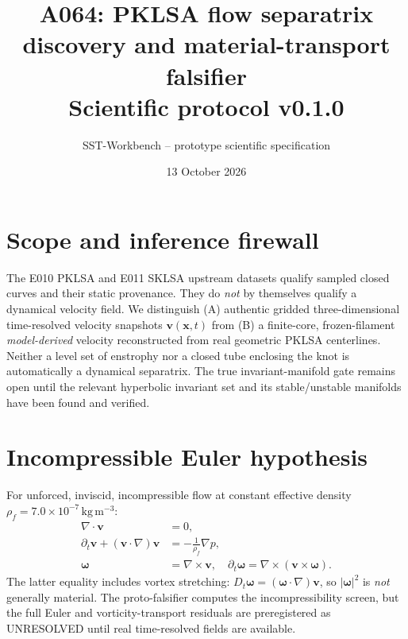 \documentclass[11pt,a4paper]{article}
\newcommand{\rhof}{\rho_{\!f}}
\begin{document}
\title{A064: PKLSA flow separatrix discovery and material-transport falsifier\\Scientific protocol v0.1.0}
\author{SST-Workbench -- prototype scientific specification}
\date{13 October 2026}
\maketitle
\section{Scope and inference firewall}
The E010 PKLSA and E011 SKLSA upstream datasets qualify sampled closed curves and their static provenance. They do \emph{not} by themselves qualify a dynamical velocity field. We distinguish (A) authentic gridded three-dimensional time-resolved velocity snapshots $\mathbf v(\mathbf x,t)$ from (B) a finite-core, frozen-filament \emph{model-derived} velocity reconstructed from real geometric PKLSA centerlines. Neither a level set of enstrophy nor a closed tube enclosing the knot is automatically a dynamical separatrix. The true invariant-manifold gate remains open until the relevant hyperbolic invariant set and its stable/unstable manifolds have been found and verified.

\section{Incompressible Euler hypothesis}
For unforced, inviscid, incompressible flow at constant effective density $\rhof=7.0\times10^{-7}\,\mathrm{kg\,m^{-3}}$:
\begin{align}
\nabla\cdot\mathbf v&=0,\\
\partial_t\mathbf v+(\mathbf v\cdot\nabla)\mathbf v &=-\frac1{\rhof}\nabla p,\\
\boldsymbol\omega&=\nabla\times\mathbf v,\quad
\partial_t\boldsymbol\omega =\nabla\times(\mathbf v\times\boldsymbol\omega).
\end{align}
The latter equality includes vortex stretching: $D_t\boldsymbol\omega=(\boldsymbol\omega\cdot\nabla)\mathbf v$, so $|\boldsymbol\omega|^2$ is \emph{not} generally material. The proto-falsifier computes the incompressibility screen, but the full Euler and vorticity-transport residuals are preregistered as UNRESOLVED until real time-resolved fields are available.
\end{document}

